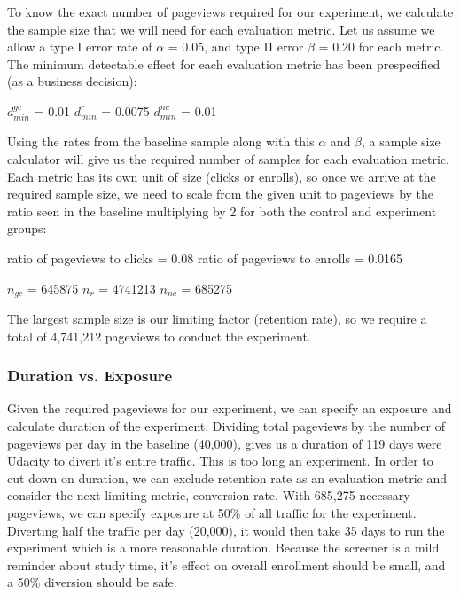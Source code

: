\documentclass[paper=a4, fontsize=11pt]{scrartcl} %
\numberwithin{equation}{section} %
\numberwithin{figure}{section} %
\numberwithin{table}{section} %
\begin{document}

To know the exact number of pageviews required for our experiment, we calculate the sample size that we will need for each evaluation metric.  Let us assume we allow a type I error rate of $\alpha$ = 0.05, and type II error $\beta$ = 0.20 for each metric.  The minimum detectable effect for each evaluation metric has been prespecified (as a business decision): \newline

$d_{min}^{gc}$ = 0.01\quad
$d_{min}^{r}$ = 0.0075\quad
$d_{min}^{nc}$ = 0.01
\newline

Using the rates from the baseline sample along with this $\alpha$ and $\beta$, a sample size calculator
will give us the required number of samples for each evaluation metric.  Each metric has it\textquotesingle s own unit of size (clicks or enrolls), so once we arrive at the required sample size, we need to scale from the given unit to pageviews by the ratio seen in the baseline multiplying by 2 for both the control and experiment groups: \newline

ratio of pageviews to clicks = 0.08 \newline
ratio of pageviews to enrolls = 0.0165 \newline


$n_{gc}$ = 645875\quad
$n_{r}$ = 4741213\quad
$n_{nc}$ = 685275
\newline

The largest sample size is our limiting factor (retention rate), so we require a total of 4,741,212 pageviews to conduct the experiment. \newline


\subsubsection{Duration vs. Exposure}


Given the required pageviews for our experiment, we can specify an exposure and calculate duration of the experiment.  Dividing total pageviews by the number of pageviews per day in the baseline (40,000), gives us a duration of 119 days were Udacity to divert it's entire traffic.  This is too long an experiment.  In order to cut down on duration, we can exclude retention rate as an evaluation metric and consider the next limiting metric, conversion rate.  With 685,275 necessary pageviews, we can specify exposure at 50\% of all traffic for the experiment.  Diverting half the traffic per day (20,000), it would then take 35 days to run the experiment which is a more reasonable duration.  Because the screener is a mild reminder about study time, it's effect on overall enrollment should be small, and a 50\% diversion should be safe.\newline
\end{document}
